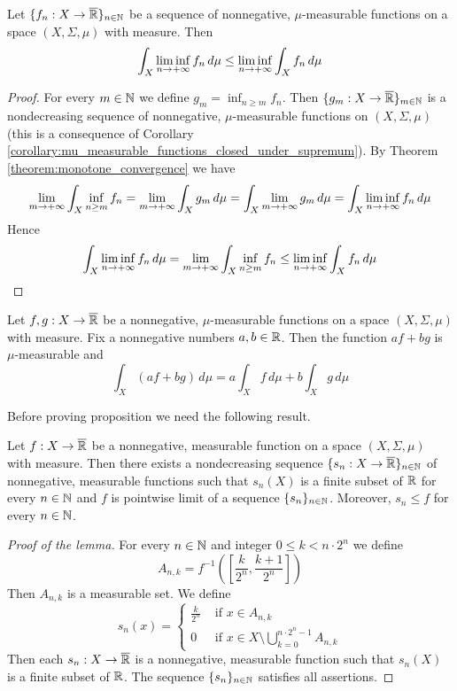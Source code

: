 \begin{theorem}\label{theorem:fatous_lemma}
Let $\{f_n:X\rightarrow \overline{{\mathbb R}}\}_{n\in {\mathbb N}}$ be a sequence of nonnegative, $\mu$-measurable functions on a space $(X,\Sigma,\mu)$ with measure. Then
$$\int_X\liminf_{n\rightarrow +\infty}f_n\,d\mu \leq \liminf_{n\rightarrow +\infty}\int_Xf_n\,d\mu$$
\end{theorem}
\begin{proof}
For every $m\in {\mathbb N}$ we define $g_m = \inf_{n\geq m}f_n$. Then $\{g_m:X\rightarrow \overline{{\mathbb R}}\}_{m\in {\mathbb N}}$ is a nondecreasing sequence of nonnegative, $\mu$-measurable functions on $(X,\Sigma,\mu)$ (this is a consequence of Corollary \ref{corollary:mu_measurable_functions_closed_under_supremum}). By Theorem \ref{theorem:monotone_convergence} we have
$$\lim_{m\rightarrow +\infty}\int_X\inf_{n\geq m}f_n = \lim_{m\rightarrow +\infty}\int_Xg_m\,d\mu = \int_X\lim_{m\rightarrow +\infty}g_m\,d\mu = \int_X\liminf_{n\rightarrow +\infty}f_n\,d\mu$$
Hence
$$\int_X\liminf_{n\rightarrow +\infty}f_n\,d\mu = \lim_{m\rightarrow +\infty}\int_X\inf_{n\geq m}f_n \leq \liminf_{n\rightarrow +\infty}\int_Xf_n\,d\mu$$
\end{proof}

\begin{proposition}\label{proposition:integral_is_linear}
Let $f,g:X\rightarrow \overline{{\mathbb R}}$ be a nonnegative, $\mu$-measurable functions on a space $(X,\Sigma,\mu)$ with measure. Fix a nonnegative numbers $a, b\in {\mathbb R}$. Then the function $a f+b  g$ is $\mu$-measurable and 
$$\int_X\left(a f+b  g\right)\,d\mu = a \int_Xf\,d\mu + b \int_Xg\,d\mu$$
\end{proposition}
\noindent
Before proving proposition we need the following result.

\begin{lemma}\label{lemma:simple_approximation}
Let $f:X\rightarrow \overline{{\mathbb R}}$ be a nonnegative, measurable function on a space $(X,\Sigma,\mu)$ with measure. Then there exists a nondecreasing sequence $\{s_n:X\rightarrow \overline{{\mathbb R}}\}_{n\in {\mathbb N}}$ of nonnegative, measurable functions such that $s_n(X)$ is a finite subset of ${\mathbb R}$ for every $n\in {\mathbb N}$ and $f$ is pointwise limit of a sequence $\{s_n\}_{n\in {\mathbb N}}$. Moreover, $s_n\leq f$ for every $n\in {\mathbb N}$.
\end{lemma}
\begin{proof}[Proof of the lemma]
For every $n\in {\mathbb N}$ and integer $0 \leq k < n\cdot 2^n$ we define 
$$A_{n,k}=f^{-1}\left(\left[\frac{k}{2^n},\frac{k+1}{2^n}\right]\right)$$
Then $A_{n,k}$ is a measurable set. We define
$$s_n(x)=\begin{cases}\frac{k}{2^n}& \mbox{ if } x\in A_{n,k}\\
0& \mbox{ if } x\in X\setminus \bigcup_{k=0}^{n\cdot 2^n-1}A_{n,k}
\end{cases}$$
Then each $s_n:X\rightarrow \overline{{\mathbb R}}$ is a nonnegative, measurable function such that $s_n(X)$ is a finite subset of ${\mathbb R}$. The sequence $\{s_n\}_{n\in {\mathbb N}}$ satisfies all assertions.
\end{proof}

